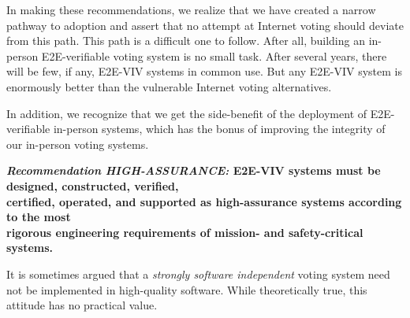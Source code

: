In making these recommendations, we realize that we have created a
narrow pathway to adoption and assert that no attempt at Internet
voting should deviate from this path.  This path is a difficult one to
follow.  After all, building an in-person E2E-verifiable voting system
is no small task.  After several years, there will be few, if any,
E2E-VIV systems in common use.  But any E2E-VIV system is enormously
better than the vulnerable Internet voting alternatives.  

In addition, we recognize that we get the side-benefit of the
deployment of E2E-verifiable in-person systems, which has the bonus of
improving the integrity of our in-person voting systems.

\begin{center}
  \textbf{\emph{Recommendation HIGH-ASSURANCE:} E2E-VIV systems must
    be designed,
    constructed, verified,\\
    certified, operated, and supported as high-assurance systems
    according to the most\\
    rigorous engineering requirements of mission- and safety-critical
    systems.}
\end{center}

It is sometimes argued that a \emph{strongly software independent}
voting system need not be implemented in high-quality software. While
theoretically true, this attitude has no practical value. 

